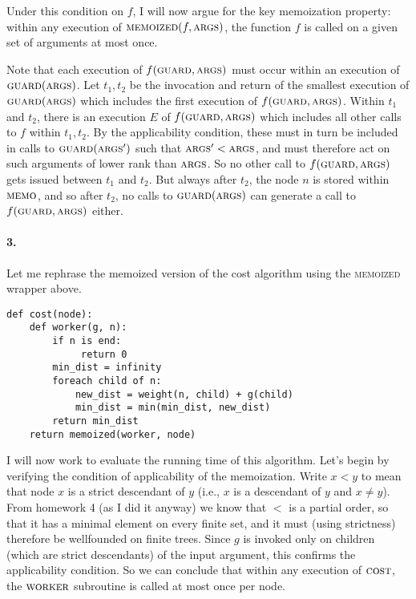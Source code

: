 \documentclass[
]{article}
\newcommand{\tsc}[1]{\ensuremath{\textsc{#1}}}
\begin{document}
Under this condition on $f$, I will now argue for the key memoization property: within any execution of $\tsc{memoized}(f, \tsc{args})$, the function $f$ is called on a given set of arguments at most once.

Note that each execution of $f(\tsc{guard}, \tsc{args})$ must occur within an execution of $\tsc{guard}(\tsc{args})$.  Let $t_1,t_2$ be the invocation and return of the smallest execution of $\tsc{guard}(\tsc{args})$ which includes the first execution of $f(\tsc{guard}, \tsc{args})$.  Within $t_1$ and $t_2$, there is an execution $E$ of $f(\tsc{guard}, \tsc{args})$ which includes all other calls to $f$ within $t_1,t_2$.  By the applicability condition, these must in turn be included in calls to $\tsc{guard}(\tsc{args}')$ such that $\tsc{args}'<\tsc{args}$, and must therefore act on such arguments of lower rank than \tsc{args}.  So no other call to $f(\tsc{guard}, \tsc{args})$ gets issued between $t_1$ and $t_2$.  But always after $t_2$, the node $n$ is stored within \tsc{memo}, and so after $t_2$, no calls to $\tsc{guard}(\tsc{args})$ can generate a call to $f(\tsc{guard}, \tsc{args})$ either.  



\paragraph{3.}  Let me rephrase the memoized version of the cost algorithm using the \textsc{memoized} wrapper above.
\begin{verbatim}
def cost(node):
    def worker(g, n):
        if n is end:
             return 0   
        min_dist = infinity
        foreach child of n:
            new_dist = weight(n, child) + g(child)
            min_dist = min(min_dist, new_dist)
        return min_dist
    return memoized(worker, node)

\end{verbatim}
I will now work to evaluate the running time of this algorithm.  
Let's begin by verifying the condition of applicability of the memoization.  Write $x<y$ to mean that node $x$ is a strict descendant of $y$ (i.e., $x$ is a descendant of $y$ and $x\neq y$).  From homework 4 (as I did it anyway) we know that $<$ is a partial order, so that it has a minimal element on every finite set, and it must (using strictness) therefore be wellfounded on finite trees.  Since $g$ is invoked only on children (which are strict descendants) of the input argument, this confirms the applicability condition.  So we can conclude that within any execution of $\tsc{cost}$, the \tsc{worker} subroutine is called at most once per node.
\end{document}
